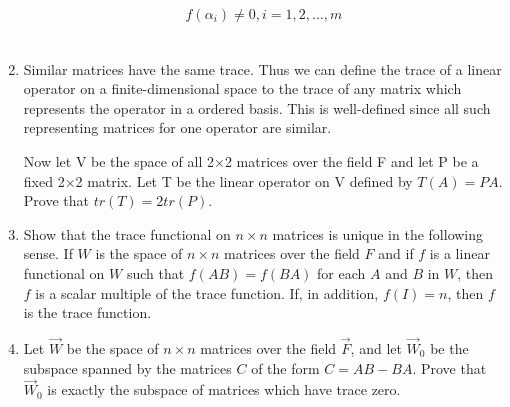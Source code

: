 \begin{enumerate}[label=\thesubsection.\arabic*.,ref=\thesubsection.\theenumi]
\begin{align}
    f(\alpha_i) \neq 0, i=1,2,\hdots,m
\end{align}
%
\\
\solution

\item Similar matrices have the same trace. Thus we can define the trace of a linear operator on a finite-dimensional space to the trace of any matrix which represents the operator in a ordered basis. This is well-defined since all such representing matrices for one operator are similar. 

Now let V be the space of all 2$\times$2 matrices over the field F and let P be a fixed 2$\times$2 matrix. Let T be the linear operator on V defined by $T(A)=PA$. Prove that $tr(T)=2tr(P)$. 
%
\\
\solution

\item Show that the trace functional on $n\times n$ matrices is unique in the following sense. If $W$ is the space of $n \times n$ matrices over the field $F$ and if $f$ is a linear functional on $W$ such that $f(AB) = f(BA)$ for each $A$ and $B$ in $W$, then $f$ is a scalar multiple of the trace function. If, in addition, $f(I)=n$, then $f$ is the trace function.
\\
\solution

\item Let $\vec{W}$ be the space of $n\times n$ matrices over the field $\vec{F}$, and let $\vec{W}_0$ be 
the subspace spanned by the matrices $C$ of the form $C=AB-BA$. Prove that $\vec{W}_0$ is exactly the
subspace of matrices which have trace zero.
%
\\
\solution

\end{enumerate}
